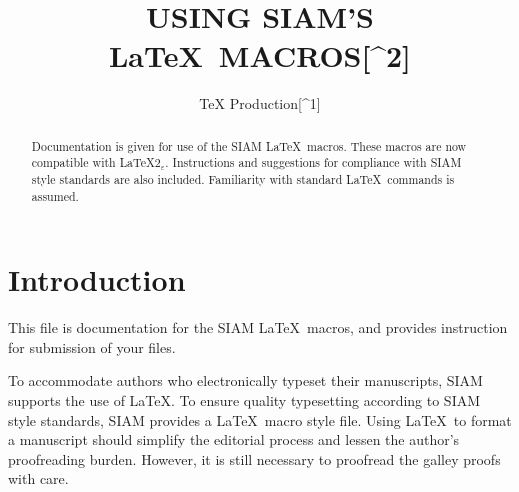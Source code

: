 \documentclass[]{siamltex}
\title{USING SIAM'S LaTeX~MACROS{[}\^{}2{]}}
\author{TeX Production{[}\^{}1{]}}
\date{}
\begin{document}
\maketitle
\begin{abstract}
Documentation is given for use of the SIAM LaTeX~macros. These macros
are now compatible with LaTeX\(2_{\varepsilon}\). Instructions and
suggestions for compliance with SIAM style standards are also included.
Familiarity with standard LaTeX~commands is assumed.
\end{abstract}

\section{Introduction}\label{introduction}

This file is documentation for the SIAM LaTeX~macros, and provides
instruction for submission of your files.

To accommodate authors who electronically typeset their manuscripts,
SIAM supports the use of LaTeX. To ensure quality typesetting according
to SIAM style standards, SIAM provides a LaTeX~macro style file. Using
LaTeX~to format a manuscript should simplify the editorial process and
lessen the author's proofreading burden. However, it is still necessary
to proofread the galley proofs with care.
\end{document}
